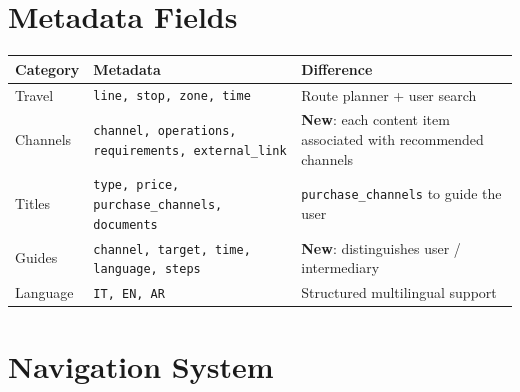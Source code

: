 ﻿\documentclass[11pt,a4paper]{article}
\begin{document}
\section{Metadata Fields}

\begin{tcolorbox}[rffield]
\small
\renewcommand{\arraystretch}{1.1}
\begin{tabular}{|p{2.5cm}|p{5.5cm}|p{5cm}|}
\hline
\textbf{Category} & \textbf{Metadata} & \textbf{Difference} \\
\hline
Travel & \texttt{line, stop, zone, time} & Route planner + user search \\
\hline
Channels & \texttt{channel, operations, requirements, external\_link} & \textbf{New}: each content item associated with recommended channels \\
\hline
Titles & \texttt{type, price, purchase\_channels, documents} & \texttt{purchase\_channels} to guide the user \\
\hline
Guides & \texttt{channel, target, time, language, steps} & \textbf{New}: distinguishes user / intermediary \\
\hline
Language & \texttt{IT, EN, AR} & Structured multilingual support \\
\hline
\end{tabular}
\end{tcolorbox}

\section{Navigation System}
\end{document}
